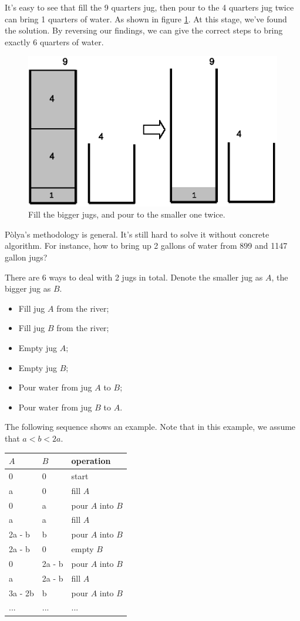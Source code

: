 \documentclass[UTF8]{article}
\begin{document}
It's easy to see that fill the 9 quarters jug, then pour to the 4 quarters
jug twice can bring 1 quarters of water. As shown in figure \ref{fig:jugs-r2}.
At this stage, we've found the solution. By reversing our findings, we
can give the correct steps to bring exactly 6 quarters of water.

\begin{figure}[htbp]
 \centering
 \includegraphics[scale=0.5]{img/jugs-r2.eps}
 \caption{Fill the bigger jugs, and pour to the smaller one twice.}
 \label{fig:jugs-r2}
\end{figure}

P\`{o}lya's methodology is general. It's still hard to solve it without
concrete algorithm. For instance, how to bring up 2 gallons of water from
899 and 1147 gallon jugs?

There are 6 ways to deal with 2 jugs in total. Denote the smaller jug as $A$,
the bigger jug as $B$.

\begin{itemize}
\item Fill jug $A$ from the river;
\item Fill jug $B$ from the river;
\item Empty jug $A$;
\item Empty jug $B$;
\item Pour water from jug $A$ to $B$;
\item Pour water from jug $B$ to $A$.
\end{itemize}

The following sequence shows an example. Note that in this example, we
assume that $a < b < 2a$.

\begin{tabular}{l|l|l}
$A$ & $B$ & operation \\
\hline
0 & 0 & start \\
a & 0 & fill $A$ \\
0 & a & pour $A$ into $B$ \\
a & a & fill $A$ \\
2a - b & b & pour $A$ into $B$ \\
2a - b & 0 & empty $B$ \\
0 & 2a - b & pour $A$ into $B$ \\
a & 2a - b & fill $A$ \\
3a - 2b & b & pour $A$ into $B$ \\
... & ... & ... \\
\end{tabular}
\end{document}

